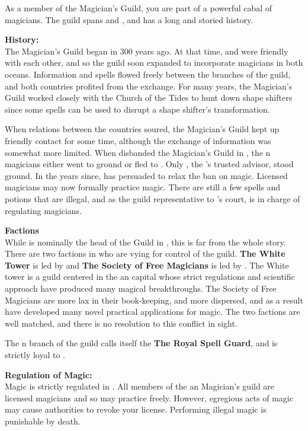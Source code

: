 \documentclass[blue]{NeptuneBall}
\begin{document}
\name{\bMagician{}}

As a member of the Magician's Guild, you are part of a powerful cabal of magicians. The guild spans \pAtlantis{} and \pPacifica{}, and has a long and storied history.

{\bf History:}\\
The Magician's Guild began in \pAtlantis{} 300 years ago. At that time, \pAtlantis{} and \pPacifica{} were friendly with each other, and so the guild soon expanded to incorporate magicians in both oceans. Information and spells flowed freely between the branches of the guild, and both countries profited from the exchange. For many years, the Magician's Guild worked closely with the Church of the Tides to hunt down shape shifters since some spells can be used to disrupt a shape shifter's transformation.

When relations between the countries soured, the Magician's Guild kept up friendly contact for some time, although the exchange of information was somewhat more limited. When \cKing{\King} \cKing{} disbanded the Magician's Guild in \pAtlantis{}, the \pAtlantis{}n magicians either went to ground or fled to \pPacifica{}. Only \cManta{}, the \cKing{\King}'s trusted advisor, stood \cManta{\their} ground. In the years since, \cManta{} has persuaded \cKing{} to relax the ban on magic. Licensed magicians may now formally practice magic. There are still a few spells and potions that are illegal, and as the guild representative to \cKing{\King} \cKing{}'s court, \cManta{} is in charge of regulating magicians.

{\bf Factions}\\
While \cManta{} is nominally the head of the Guild in \pAtlantis{}, this is far from the whole story. There are two factions in \pAtlantis{} who are vying for control of the guild. {\bf The White Tower} is led by \cManta{} and {\bf The Society of Free Magicians} is led by \cWitch{\MYname}. The White tower is a guild centered in the \pAtlantis{}an capital whose strict regulations and scientific approach have produced many magical breakthroughs. The Society of Free Magicians are more lax in their book-keeping, and more dispersed, and as a result have developed many novel practical applications for magic. The two factions are well matched, and there is no resolution to this conflict in sight.

The \pPacifica{}n branch of the guild calls itself the {\bf The Royal Spell Guard}, and is strictly loyal to \pPacifica{}.

{\bf Regulation of Magic:}\\
Magic is strictly regulated in \pAtlantis{}. All members of the \pAtlantis{}an Magician's guild are licensed magicians and so may practice freely. However, egregious acts of magic may cause authorities to revoke your license. Performing illegal magic is punishable by death.
\end{document}
